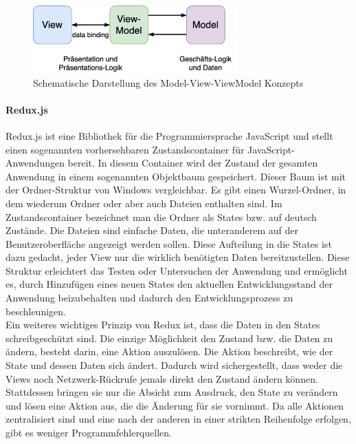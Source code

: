 \documentclass[notables, nomenclature, oneside, 150]{HSMW-Thesis}
\begin{document}
			\begin{figure}[h!]
    			\centering
    			\includegraphics[width=0.7\textwidth]{img/mvvm}
    			\caption{Schematische Darstellung des Model-View-ViewModel Konzepts}
    			\label{fig:mvvm}
    		\end{figure}
    		
		\vspace{-5mm}
		\paragraph*{Redux.js}
			Redux.js ist eine Bibliothek für die Programmiersprache JavaScript und stellt einen sogenannten vorhersehbaren Zustandscontainer für JavaScript-Anwendungen bereit. In diesem Container wird der Zustand der gesamten Anwendung in einem sogenannten Objektbaum gespeichert. Dieser Baum ist mit der Ordner-Struktur von Windows vergleichbar. Es gibt einen Wurzel-Ordner, in dem wiederum Ordner oder aber auch Dateien enthalten sind. Im Zustandscontainer bezeichnet man die Ordner als States bzw. auf deutsch Zustände. Die Dateien sind einfache Daten, die unteranderem auf der Benutzeroberfläche angezeigt werden sollen. Diese Aufteilung in die States ist dazu gedacht, jeder View nur die wirklich benötigten Daten bereitzustellen. Diese Struktur erleichtert das Testen oder Untersuchen der Anwendung und ermöglicht es, durch Hinzufügen eines neuen States den aktuellen Entwicklungsstand der Anwendung beizubehalten und dadurch den Entwicklungsprozess zu beschleunigen. \\
			Ein weiteres wichtiges Prinzip von Redux ist, dass die Daten in den States schreibgeschützt sind. Die einzige Möglichkeit den Zustand bzw. die Daten zu ändern, besteht darin, eine Aktion auszulösen. Die Aktion beschreibt, wie der State und dessen Daten sich ändert. Dadurch wird sichergestellt, dass weder die Views noch Netzwerk-Rückrufe jemals direkt den Zustand ändern können. Stattdessen bringen sie nur die Absicht zum Ausdruck, den State zu verändern und lösen eine Aktion aus, die die Änderung für sie vornimmt. Da alle Aktionen zentralisiert sind und eine nach der anderen in einer strikten Reihenfolge erfolgen, gibt es weniger Programmfehlerquellen.
\end{document}
